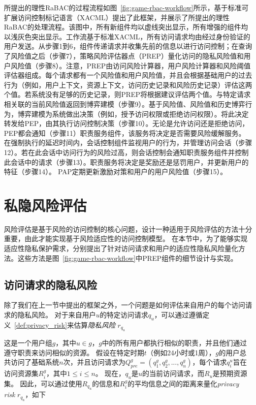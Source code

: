 所提出的理性RaBAC的过程流程如图~\ref{fig:game-rbac-workflow}所示，基于标准可扩展访问控制标记语言（XACML）提出了此框架，并展示了所提出的理性RaBAC的处理流程。该图中，所有新组件均以虚线突出显示，所有增强的组件均以浅灰色突出显示。工作流基于标准XACML，所有访问请求均由经过身份验证的用户发送。从步骤1到6，组件传递请求并收集先前的信息以进行访问控制；在查询了风险值之后（步骤7），策略风险评估器点（PREP）量化访问的隐私风险值和用户风险值（步骤8）。注意，PREP由访问风险计算器，用户风险计算器和风险阈值评估器组成。每个请求都有一个风险值和用户风险值，并且会根据基础用户的过去行为（例如，用户上下文，资源上下文，访问历史记录和风险历史记录）评估这两个值。若系统没有足够的历史记录，则PREP将根据建议评估两个值。与特定请求相关联的当前风险值返回到博弈建模（步骤9）。基于风险值、风险值和历史博弈行为，博弈建模为系统做出决策（例如，授予访问权限或拒绝访问权限）。将此决定转发给PEP，由其执行访问控制决策（步骤10）。无论是允许访问还是拒绝访问，PEP都会通知（步骤11）职责服务组件，该服务将决定是否需要风险缓解服务。在强制执行的延迟时间内，会话控制组件监视用户的行为，并管理访问会话（步骤12）。若在此会话中访问行为的风险过高，则会话控制会通知职责服务组件并控制此会话中的请求（步骤13）。职责服务将决定是奖励还是惩罚用户，并更新用户的特征（步骤14）。 PAP定期更新激励对策和用户的用户风险值（步骤15）。

\section{私隐风险评估}
\label{sec:riskvalue}

风险评估是基于风险的访问控制的核心问题，设计一种适用于风险评估的方法十分重要，由此才能实现基于风险适应性的访问控制模型。 在本节中，为了能够实现适应性隐私保护需求，分别提出了针对访问请求和用户的适应性隐私风险量化方法。这些方法是图~\ref{fig:game-rbac-workflow}中PREP组件的细节设计与实现。

\subsection{访问请求的隐私风险}

除了我们在上一节中提出的框架之外，一个问题是如何评估来自用户的每个访问请求的隐私风险。 对于来自用户$u$的特定访问请求$q_u$，可以通过遵循定义~\ref{def:privacy_risk}来估算\emph{隐私风险} $r_{q_u}$



这是一个用户组$g$，其中$u \in g$，$g$中的所有用户都执行相似的职责，并且他们通过遵守职责来访问相似的资源。 假设在特定时期$t$（例如24小时或1周），$g$的用户总共访问了基础系统$n$次，并且访问请求为$Q^g_{pre}=(q^g_1,q^g_2,...,q^g_n)$，每个请求$q^u_i$旨在访问资源集$R^g_i$，其中$1 \leq i \leq n$。
现在，$q_u$是$u$的当前访问请求，而$R_u$是预期资源集。 因此，可以通过使用$R_{q_u}$的信息和$R^g_i$的平均信息之间的距离来量化\emph{privacy risk} $r_{q_u}$，如下

